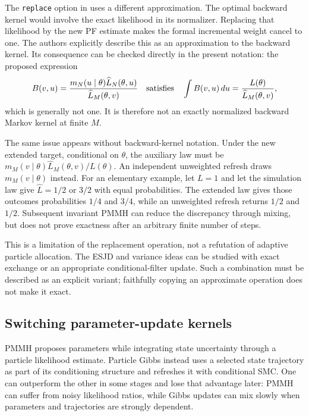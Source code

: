 The \texttt{replace} option in
\citet[Section 4.3]{botha2023adaptivesmc2} uses a different approximation.
The optimal backward kernel would involve the exact likelihood in its
normalizer. Replacing that likelihood by the new PF estimate makes the
formal incremental weight cancel to one. The authors explicitly describe
this as an approximation to the backward kernel. Its consequence can be
checked directly in the present notation: the proposed expression
\begin{equation}
 B(v,u)=\frac{m_N(u\mid\theta)\widehat L_N(\theta,u)}
                    {\widehat L_M(\theta,v)}
 \quad\hbox{satisfies}\quad
 \int B(v,u)\,du=\frac{L(\theta)}{\widehat L_M(\theta,v)},
 \label{eq:bf-is-smc2-replace-normalization}
\end{equation}
which is generally not one. It is therefore not an exactly normalized
backward Markov kernel at finite $M$.

The same issue appears without backward-kernel notation. Under the new
extended target, conditional on $\theta$, the auxiliary law must be
$m_M(v\mid\theta)\widehat L_M(\theta,v)/L(\theta)$.
An independent unweighted refresh draws $m_M(v\mid\theta)$ instead.
For an elementary example, let $L=1$ and let the simulation law give
$\widehat L=1/2$ or $3/2$ with equal probabilities. The extended law gives
those outcomes probabilities $1/4$ and $3/4$, while an unweighted refresh
returns $1/2$ and $1/2$. Subsequent invariant PMMH can reduce the discrepancy
through mixing, but does not prove exactness after an arbitrary finite
number of steps.

This is a limitation of the replacement operation, not a refutation of
adaptive particle allocation. The ESJD and variance ideas can be studied
with exact exchange or an appropriate conditional-filter update. Such a
combination must be described as an explicit variant; faithfully copying
an approximate operation does not make it exact.

\subsection{Switching parameter-update kernels}

PMMH proposes parameters while integrating state uncertainty through a
particle likelihood estimate. Particle Gibbs instead uses a selected
state trajectory as part of its conditioning structure and refreshes it
with conditional SMC. One can outperform the other in some stages and
lose that advantage later: PMMH can suffer from noisy likelihood ratios,
while Gibbs updates can mix slowly when parameters and trajectories are
strongly dependent.

